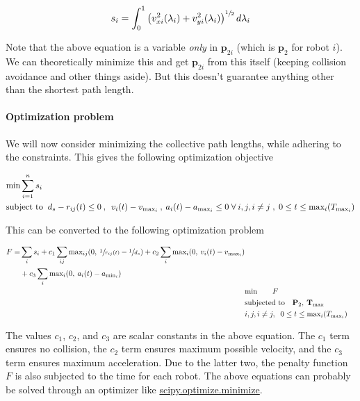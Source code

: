 \begin{equation}
    s_i = \int_0^1 \left ( v_{xi}^2 (\lambda_i) + v_{yi}^2 (\lambda_i) \right )^{\sfrac{1}{2}} d\lambda_i
\end{equation}

Note that the above equation is a variable \emph{only} in $\mathbf{p}_{2i}$ (which is $\mathbf{p}_2$ for robot $i$). We can theoretically minimize this and get $\mathbf{p}_{2i}$ from this itself (keeping collision avoidance and other things aside). But this doesn't guarantee anything other than the shortest path length.

\paragraph{Optimization problem}

We will now consider minimizing the collective path lengths, while adhering to the constraints. This gives the following optimization objective

\begin{align*}
    &\textup{min} \sum_{i=1}^{n} s_i
    \\
    &\textup{subject to} \;\; d_s - r_{ij}(t) \leq 0 \:,\: \; 
    v_i(t) - v_{\textup{max}_i} \:,\: a_i(t) - a_{\textup{max}_i} \leq 0
    \;
    \forall \: i,j,i \neq j \;,\; 0 \leq t \leq \textup{max}_i (T_{\textup{max}_i})
\end{align*}

This can be converted to the following optimization problem

\begin{align}
    \begin{split}
        F =& \sum_{i} s_i + c_1 \sum_{ij} \textup{max}_{ij} (0,\: \sfrac{1}{r_{ij}(t)} - \sfrac{1}{d_s}) + c_2 \sum_i \textup{max}_i (0,\: v_i(t) - v_{\textup{max}_i}) \\
        & + c_3 \sum_{i} \textup{max}_i (0,\: a_i(t) - a_{\textup{min}_i})
    \end{split} 
    \nonumber \\
    &\textup{min} \qquad F
    \nonumber \\
    &\textup{subjected to} \quad \mathbf{P}_2,\: \mathbf{T}_{\textup{max}}
    \nonumber \\
    & i, j, i \neq j,\;\; 0 \leq t \leq \textup{max}_i (T_{\textup{max}_i})
\end{align}

The values $c_1$, $c_2$, and $c_3$ are scalar constants in the above equation. The $c_1$ term ensures no collision, the $c_2$ term ensures maximum possible velocity, and the $c_3$ term ensures maximum acceleration. Due to the latter two, the penalty function $F$ is also subjected to the time for each robot.
The above equations can probably be solved through an optimizer like \href{https://docs.scipy.org/doc/scipy/reference/generated/scipy.optimize.minimize.html}{scipy.optimize.minimize}.

